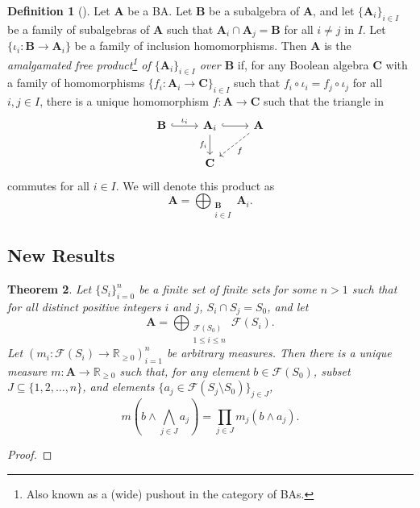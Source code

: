 \documentclass{article}
\newtheorem{theorem}{Theorem}
\theoremstyle{definition}
\newtheorem{definition}[theorem]{Definition}
\theoremstyle{remark}
\begin{document}
\begin{definition}[\cite{koppelberg1989handbook}]
  Let $\mathbf{A}$ be a BA. Let $\mathbf{B}$ be a subalgebra of $\mathbf{A}$,
  and let $\{ \mathbf{A}_i\}_{i \in I}$ be a family of subalgebras of $\mathbf{A}$
  such that $\mathbf{A}_i \cap \mathbf{A}_j = \mathbf{B}$ for all $i \ne j$ in
  $I$. Let $\{ \iota_i \colon \mathbf{B} \to \mathbf{A}_i \}$ be a family of
  inclusion homomorphisms. Then $\mathbf{A}$ is the \emph{amalgamated free
    product\footnote{Also known as a (wide) pushout in the category of BAs.} of
    $\{\mathbf{A}_{i} \}_{i \in I}$ over $\mathbf{B}$} if, for any Boolean
  algebra $\mathbf{C}$ with a family of homomorphisms $\{ f_i\colon \mathbf{A}_i
  \to \mathbf{C} \}_{i \in I}$ such that $f_i \circ \iota_i = f_j \circ \iota_j$
  for all $i, j \in I$, there is a unique homomorphism $f\colon \mathbf{A} \to
  \mathbf{C}$ such that the triangle in
  \[
    \begin{tikzcd}
      \mathbf{B} \ar[r,hookrightarrow,"\iota_i"] & \mathbf{A}_i
      \ar[r,hookrightarrow] \ar[d,swap,"f_i"] & \mathbf{A} \ar[ld,dashed,"f"] \\
      & \mathbf{C}
    \end{tikzcd}
  \]
  commutes for all $i \in I$. We will denote this product as
  \[
    \mathbf{A} = \bigoplus_{\substack{\mathbf{B}\\ i \in I}} \mathbf{A}_i.
  \]
\end{definition}

\subsection{New Results}

\begin{theorem}
  Let $\{ S_i \}_{i=0}^n$ be a finite set of finite sets for some $n > 1$ such
  that for all distinct positive integers $i$ and $j$, $S_i \cap S_j = S_0$, and
  let
  \[
    \mathbf{A} = \bigoplus_{\substack{\mathcal{F}(S_0)\\ 1 \le i \le n}}
    \mathcal{F}(S_i).
  \]
  Let $(m_i\colon \mathcal{F}(S_i) \to \mathbb{R}_{\ge 0})_{i=1}^n$ be arbitrary
  measures. Then there is a unique measure $m\colon \mathbf{A} \to
  \mathbb{R}_{\ge 0}$ such that, for any element $b \in \mathcal{F}(S_0)$,
  subset $J \subseteq \{ 1, 2, \dots, n \}$, and elements $\{ a_j \in
  \mathcal{F}(S_j \setminus S_0) \}_{j \in J}$,
  \[
    m \left(b \land \bigwedge_{j \in J} a_j \right) = \prod_{j \in J} m_j(b
    \land a_j).
  \]
\end{theorem}
\begin{proof}
\end{proof}
\end{document}
